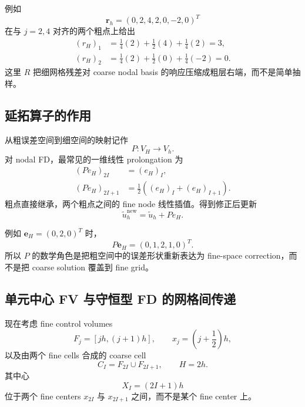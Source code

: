 例如
\begin{equation}
\bm r_h=(0,2,4,2,0,-2,0)^T
\end{equation}
在与 $j=2,4$ 对齐的两个粗点上给出
\begin{align}
(r_H)_1&=\frac14(2)+\frac12(4)+\frac14(2)=3,\\
(r_H)_2&=\frac14(2)+\frac12(0)+\frac14(-2)=0.
\end{align}
这里 $R$ 把细网格残差对 coarse nodal basis 的响应压缩成粗层右端，而不是简单抽样。

\subsection{延拓算子的作用}
\label{sec:prolongation}

从粗误差空间到细空间的映射记作
\begin{equation}
P:V_H\rightarrow V_h.
\end{equation}
对 nodal FD，最常见的一维线性 prolongation 为
\begin{align}
(Pe_H)_{2I}&=(e_H)_I,\\
(Pe_H)_{2I+1}&=\frac12\left((e_H)_I+(e_H)_{I+1}\right).
\label{eq:twogrid-nodal-linear-prolongation}
\end{align}
粗点直接继承，两个粗点之间的 fine node 线性插值。得到修正后更新
\begin{equation}
\tilde u_h^{\mathrm{new}}
=\tilde u_h+Pe_H.
\label{eq:twogrid-correction-update}
\end{equation}

例如 $\bm e_H=(0,2,0)^T$ 时，
\begin{equation}
P\bm e_H=(0,1,2,1,0)^T.
\end{equation}
所以 $P$ 的数学角色是把粗空间中的误差形状重新表达为 fine-space correction，而不是把 coarse solution 覆盖到 fine grid。

\subsection{单元中心 FV 与守恒型 FD 的网格间传递}
\label{sec:twogrid-cell-centered-transfer}

现在考虑 fine control volumes
\begin{equation}
F_j=[jh,(j+1)h],
\qquad
x_j=\left(j+\frac12\right)h,
\end{equation}
以及由两个 fine cells 合成的 coarse cell
\begin{equation}
C_I=F_{2I}\cup F_{2I+1},
\qquad
H=2h.
\end{equation}
其中心
\begin{equation}
X_I=(2I+1)h
\end{equation}
位于两个 fine centers $x_{2I}$ 与 $x_{2I+1}$ 之间，而不是某个 fine center 上。

